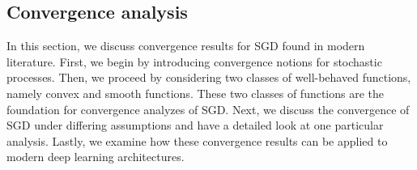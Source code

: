 \documentclass[12pt]{article}
\theoremstyle{definition}
\newtheorem{definition}[theorem]{Definition}
\numberwithin{equation}{section}
\newcommand{\R}{\mathbb{R}}
\begin{document}
\subsection{Convergence analysis}
In this section, we discuss convergence results for SGD found in modern literature. First, we begin by introducing convergence notions for stochastic processes. Then, we proceed by considering two classes of well-behaved functions, namely convex and smooth functions. These two classes of functions are the foundation for convergence analyzes of SGD. Next, we discuss the convergence of SGD under differing assumptions and have a detailed look at one particular analysis. Lastly, we examine how these convergence results can be applied to modern deep learning architectures.
\end{document}
